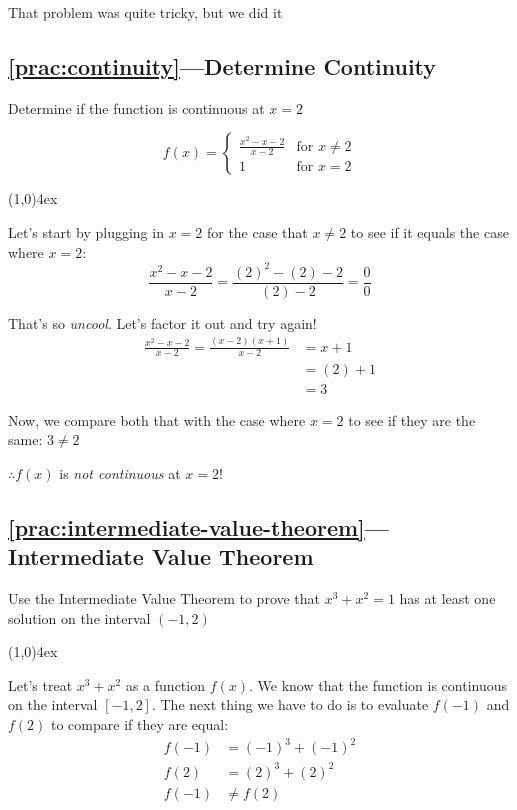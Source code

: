 \documentclass{MathNotes}
\newcommand{\br}{
	\begin{center}
		\line(1,0){4ex}
	\end{center}}
\begin{document}
That problem was quite tricky, but we did it 

\subsection*{\ref{prac:continuity}---Determine Continuity}\label{ans:continuity}
Determine if the function is continuous at $x=2$

\begin{displaymath}
	f(x) = \begin{cases}
		\frac{x^2-x-2}{x-2} & \text{for } x\neq 2 \\
		1                   & \text{for } x=2
	\end{cases}
\end{displaymath}
\br

Let's start by plugging in $x=2$ for the case that $x\neq2$ to see if it equals
the case where $x=2$:
\begin{displaymath}
	\frac{x^2-x-2}{x-2}=\frac{(2)^2-(2)-2}{(2)-2}=\frac{0}{0}
\end{displaymath}

That's so \textit{uncool}. Let's factor it out and try again!
\begin{align*}
	\frac{x^2-x-2}{x-2} = \frac{(x-2)(x+1)}{x-2} & = x+1  \\
	                                             & =(2)+1 \\
	                                             & =3
\end{align*}

Now, we compare both that with the case where $x=2$ to see if they
are the same: $3\neq2$

$\therefore f(x)$ is \textit{not continuous} at $x=2$!

\newpage

\subsection*{\ref{prac:intermediate-value-theorem}---Intermediate Value Theorem}\label{ans:intermediate-value-theorem}
Use the Intermediate Value Theorem to prove that $x^3+x^2=1$ has at least
one solution on the interval $(-1, 2)$
\br
Let's treat $x^3+x^2$ as a function $f(x)$. We know that the function is
continuous on the interval $[-1, 2]$. The next thing we have to do is to
evaluate $f(-1)$ and $f(2)$ to compare if they are equal:
\begin{align*}
	f(-1) & =(-1)^3+(-1)^2 \\
	f(2)  & =(2)^3+(2)^2   \\
	f(-1) & \neq f(2)      \\
\end{align*}
\end{document}
